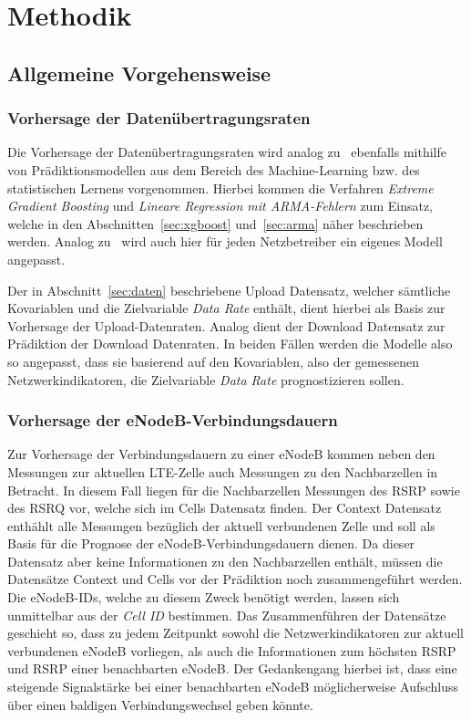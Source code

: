 \section{Methodik}

\subsection{Allgemeine Vorgehensweise}

\subsubsection{Vorhersage der Daten\"ubertragungsraten}

Die Vorhersage der Daten\"ubertragungsraten wird analog zu~\cite{IEEE} ebenfalls mithilfe von
Pr\"adiktionsmodellen aus dem Bereich des Machine-Learning bzw. des statistischen Lernens vorgenommen.
Hierbei kommen die Verfahren \textit{Extreme Gradient Boosting} und \textit{Lineare Regression mit ARMA-Fehlern}
zum Einsatz, welche in den Abschnitten~\ref{sec:xgboost} und~\ref{sec:arma} n\"aher beschrieben werden.
Analog zu~\cite{IEEE} wird auch hier f\"ur jeden Netzbetreiber ein eigenes Modell angepasst.

Der in Abschnitt~\ref{sec:daten} beschriebene Upload Datensatz, welcher s\"amtliche Kovariablen und die Zielvariable
\textit{Data Rate} enth\"alt, dient hierbei als Basis zur Vorhersage der Upload-Datenraten.
Analog dient der Download Datensatz zur Pr\"adiktion der Download Datenraten.
In beiden F\"allen werden die Modelle also so angepasst, dass sie basierend auf den Kovariablen, also der gemessenen Netzwerkindikatoren,
die Zielvariable \textit{Data Rate} prognostizieren sollen.

\subsubsection{Vorhersage der eNodeB-Verbindungsdauern}

Zur Vorhersage der Verbindungsdauern zu einer eNodeB kommen neben den Messungen zur aktuellen LTE-Zelle auch Messungen
zu den Nachbarzellen in Betracht. In diesem Fall liegen f\"ur die Nachbarzellen Messungen des RSRP sowie des RSRQ vor,
welche sich im Cells Datensatz finden. Der Context Datensatz enth\"ahlt alle Messungen bez\"uglich der aktuell verbundenen
Zelle und soll als Basis f\"ur die Prognose der eNodeB-Verbindungsdauern dienen. Da dieser Datensatz aber keine Informationen
zu den Nachbarzellen enth\"alt, m\"ussen die Datens\"atze Context und Cells vor der Pr\"adiktion noch zusammengef\"uhrt werden.
Die eNodeB-IDs, welche zu diesem Zweck ben\"otigt werden, lassen sich unmittelbar aus der \textit{Cell ID} bestimmen.
Das Zusammenf\"uhren der Datens\"atze geschieht so,
dass zu jedem Zeitpunkt sowohl die Netzwerkindikatoren zur aktuell verbundenen eNodeB vorliegen, als auch die
Informationen zum h\"ochsten RSRP und RSRP einer benachbarten eNodeB.
Der Gedankengang hierbei ist, dass eine steigende Signalst\"arke bei einer benachbarten eNodeB m\"oglicherweise Aufschluss \"uber einen
baldigen Verbindungswechsel geben k\"onnte.

